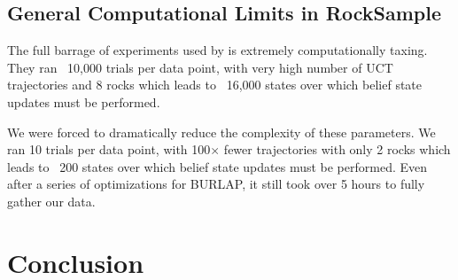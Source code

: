 \documentclass[11pt]{article} %
\begin{document}
\subsection{General Computational Limits in RockSample}
\label{sec: compLim}
The full barrage of experiments used by \cite{jiang2015dependence} is extremely computationally taxing. They ran ~10,000 trials per data point, with very high number of UCT trajectories and 8 rocks which leads to ~16,000 states over which belief state updates must be performed. 

We were forced to dramatically reduce the complexity of these parameters. We ran 10 trials per data point, with 100$\times$ fewer trajectories with only 2 rocks which leads to ~200 states over which belief state updates must be performed. Even after a series of optimizations for BURLAP, it still took over 5 hours to fully gather our data.


\section{Conclusion}




\end{document}
